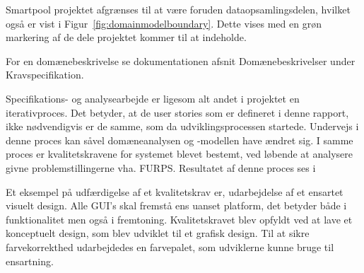 Smartpool projektet afgrænses til at være foruden dataopsamlingsdelen, hvilket også er vist i Figur~\ref{fig:domainmodelboundary}. Dette vises med en grøn markering af de dele projektet kommer til at indeholde.

For en domænebeskrivelse se dokumentationen afsnit Domænebeskrivelser under Kravspecifikation.

Specifikations- og analysearbejde er ligesom alt andet i projektet en iterativproces. Det betyder, at de user stories som er defineret i denne rapport, ikke nødvendigvis er de samme, som da udviklingsprocessen startede. Undervejs i denne proces kan såvel domæneanalysen og -modellen have ændret sig. I samme proces er kvalitetskravene for systemet blevet bestemt, ved løbende at analysere givne problemstillingerne vha. FURPS. Resultatet af denne proces ses i  

Et eksempel på udfærdigelse af et kvalitetskrav er, udarbejdelse af et ensartet visuelt design. Alle GUI's skal fremstå ens uanset platform, det betyder både i funktionalitet men også i fremtoning. Kvalitetskravet blev opfyldt ved at lave et konceptuelt design, som blev udviklet til et grafisk design. Til at sikre farvekorrekthed udarbejdedes en farvepalet, som udviklerne kunne bruge til ensartning.


